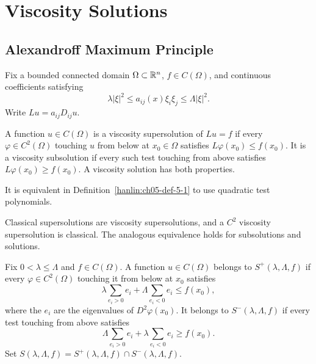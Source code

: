 \chapter{Viscosity Solutions}

\section{Alexandroff Maximum Principle}

Fix a bounded connected domain $\Omega\subset\mathbb{R}^n$, $f\in C(\Omega)$,
and continuous coefficients satisfying
\[
\lambda|\xi|^2\leq a_{ij}(x)\xi_i\xi_j\leq\Lambda|\xi|^2.
\]
Write $Lu=a_{ij}D_{ij}u$.

\begin{definition}\label{hanlin:ch05-def-5-1}
A function $u\in C(\Omega)$ is a viscosity supersolution of $Lu=f$ if
every $\varphi\in C^2(\Omega)$ touching $u$ from below at
$x_0\in\Omega$ satisfies $L\varphi(x_0)\leq f(x_0)$. It is a viscosity
subsolution if every such test touching from above satisfies
$L\varphi(x_0)\geq f(x_0)$. A viscosity solution has both properties.
\end{definition}

\begin{remark}\label{hanlin:ch05-rem-5-2}
It is equivalent in Definition~\ref{hanlin:ch05-def-5-1} to use quadratic
test polynomials.
\end{remark}

\begin{remark}\label{hanlin:ch05-rem-5-3}
Classical supersolutions are viscosity supersolutions, and a $C^2$ viscosity
supersolution is classical. The analogous equivalence holds for subsolutions
and solutions.
\end{remark}
\begin{definition}\label{hanlin:ch05-def-5-4}
Fix $0<\lambda\leq\Lambda$ and $f\in C(\Omega)$. A function
$u\in C(\Omega)$ belongs to $S^+(\lambda,\Lambda,f)$ if every
$\varphi\in C^2(\Omega)$ touching it from below at $x_0$ satisfies
\[
\lambda\sum_{e_i>0}e_i+\Lambda\sum_{e_i<0}e_i\leq f(x_0),
\]
where the $e_i$ are the eigenvalues of $D^2\varphi(x_0)$. It belongs to
$S^-(\lambda,\Lambda,f)$ if every test touching from above satisfies
\[
\Lambda\sum_{e_i>0}e_i+\lambda\sum_{e_i<0}e_i\geq f(x_0).
\]
Set $S(\lambda,\Lambda,f)=S^+(\lambda,\Lambda,f)\cap
S^-(\lambda,\Lambda,f)$.
\end{definition}




